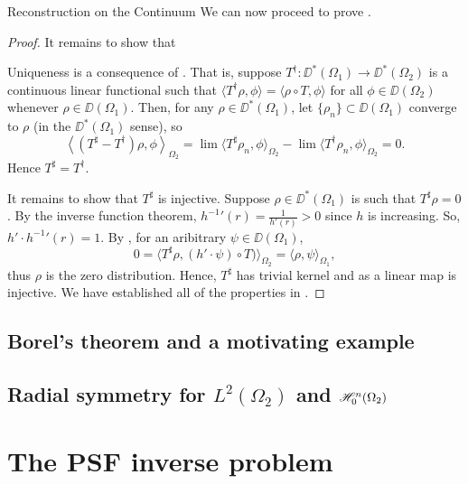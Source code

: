 \begin{chapter}{Reconstruction on the Continuum}
We can now proceed to prove .
\begin{proof}
  It remains to show that 

  Uniqueness is a consequence of . That is, suppose $T^\dagger:\DD^*(\Omega_1) \to \DD^*(\Omega_2)$ is a continuous linear functional such that $\langle T^\dagger \rho,\phi \rangle = \langle \rho \circ T, \phi\rangle$ for all $\phi \in \DD(\Omega_2)$ whenever $\rho \in \DD(\Omega_1)$. Then, for any $\rho \in \DD^*(\Omega_1)$, let $\{\rho_n\}\subset \DD(\Omega_1)$ converge to $\rho$ (in the $\DD^*(\Omega_1)$ sense), so 
  \begin{equation}
    \left\langle (T^\sharp - T^\dagger)\rho,\phi\right\rangle_{\Omega_2} = \lim \langle T^\sharp\rho_n,\phi\rangle_{\Omega_2} - \lim \langle T^\dagger\rho_n,\phi\rangle_{\Omega_2} = 0.
  \end{equation}
  Hence $T^\sharp = T^\dagger$.
  
  It remains to show that $T^\sharp$ is injective. Suppose $\rho \in \DD^*(\Omega_1)$ is such that $T^\sharp \rho = 0$.
  By the inverse function theorem,
  ${h^{-1}}'(r) = \frac 1{h'(r)} > 0$ since $h$ is increasing.
  So, $h' \cdot {h^{-1}}' (r) = 1$.
  By , for an aribitrary $\psi\in \DD(\Omega_1)$,
  \begin{equation}
    0 = \Big\langle T^\sharp \rho, (h' \cdot \psi) \circ T)\Big\rangle_{\Omega_2} = \Big\langle \rho, \psi\Big\rangle_{\Omega_1},
  \end{equation}
  thus $\rho$ is the zero distribution.  Hence, $T^\sharp$ has trivial kernel and as a linear map is injective.
  We have established all of the properties in .
\end{proof}

\subsection{Borel's theorem and a motivating example}
\subsection{Radial symmetry for $L^2(\Omega_2)$ and $\mathscr H_0^n(\Omega_2)$}

\section{The PSF inverse problem}

\end{chapter}
